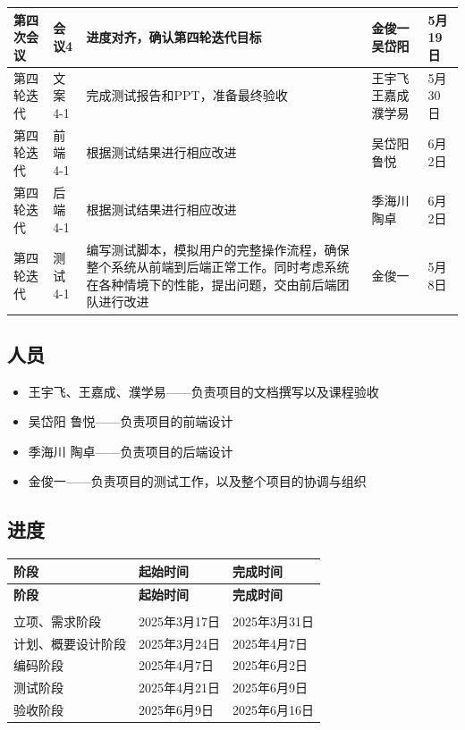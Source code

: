\documentclass[12pt,a4paper,UTF8]{article}
\begin{document}
\begin{xltabular}{\linewidth}{|>{\centering\arraybackslash}p{2.2cm}|>{\centering\arraybackslash}p{2cm}|>{\raggedright\arraybackslash}p{6cm}|>{\centering\arraybackslash}p{1.5cm}|>{\centering\arraybackslash}p{2cm}|}
  第四次会议 & 会议4 & 进度对齐，确认第四轮迭代目标 & 金俊一 吴岱阳 & 5月19日 \\ \hline
  第四轮迭代 & 文案4-1 & 完成测试报告和PPT，准备最终验收 & 王宇飞 王嘉成 濮学易 & 5月30日 \\ \hline
  第四轮迭代 & 前端4-1 & 根据测试结果进行相应改进 & 吴岱阳 鲁悦 & 6月2日 \\ \hline
  第四轮迭代 & 后端4-1 & 根据测试结果进行相应改进 & 季海川 陶卓 & 6月2日 \\ \hline
  第四轮迭代 & 测试4-1 & 编写测试脚本，模拟用户的完整操作流程，确保整个系统从前端到后端正常工作。同时考虑系统在各种情境下的性能，提出问题，交由前后端团队进行改进 & 金俊一 & 5月8日 \\ \hline
\end{xltabular}

\subsection{人员}
\begin{itemize}
  \item 王宇飞、王嘉成、濮学易——负责项目的文档撰写以及课程验收
  \item 吴岱阳 鲁悦——负责项目的前端设计
  \item 季海川 陶卓——负责项目的后端设计
  \item 金俊一——负责项目的测试工作，以及整个项目的协调与组织
\end{itemize}

\subsection{进度}

\begin{xltabular}{\linewidth}{|>{\centering\arraybackslash}p{4cm}|>{\centering\arraybackslash}p{4cm}|>{\centering\arraybackslash}p{4cm}|}
  \hline
  \textbf{阶段} & \textbf{起始时间} & \textbf{完成时间} \\ \hline 
  \endfirsthead
  
  \hline
  \textbf{阶段} & \textbf{起始时间} & \textbf{完成时间} \\ \hline  
  \endhead
  
  \hline
   \\ 
  \endfoot

  \hline \endlastfoot

  立项、需求阶段 & 2025年3月17日 & 2025年3月31日 \\ \hline
  计划、概要设计阶段 & 2025年3月24日 & 2025年4月7日 \\ \hline
  编码阶段 & 2025年4月7日 & 2025年6月2日 \\ \hline
  测试阶段 & 2025年4月21日 & 2025年6月9日 \\ \hline
  验收阶段 & 2025年6月9日 & 2025年6月16日 \\ \hline
\end{xltabular}
\end{document}
